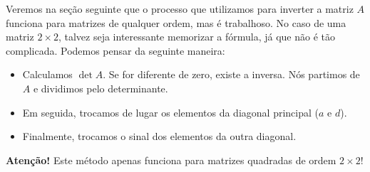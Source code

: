 \documentclass[../livro.tex]{subfiles}  %
\begin{document}
\begin{remark}
	Veremos na seção seguinte que o processo que utilizamos para inverter a matriz $A$ funciona para matrizes de qualquer ordem, mas é trabalhoso. No caso de uma matriz $2\times 2$, talvez seja interessante memorizar a fórmula, já que não é tão complicada. Podemos pensar da seguinte maneira:
	\begin{itemize}
		\item Calculamos $\det A$. Se for diferente de zero, existe a inversa. Nós partimos de $A$ e dividimos pelo determinante.
		\item Em seguida, trocamos de lugar os elementos da diagonal principal ($a$ e $d$).
		\item Finalmente, trocamos o sinal dos elementos da outra diagonal.
	\end{itemize}
	\textbf{Atenção!} Este método apenas funciona para matrizes quadradas de ordem $2\times 2$!
\end{remark}
\end{document}
